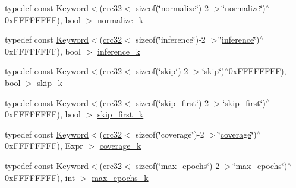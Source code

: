 \begin{DoxyCompactItemize}
\item 
typedef const \hyperlink{classmarian_1_1keywords_1_1Keyword}{Keyword}$<$(\hyperlink{compile__time__crc32_8h_afb8250edaa6a10de4050142c2361fbce}{crc32}$<$ sizeof(\char`\"{}normalize\char`\"{})-\/2 $>$\char`\"{}\hyperlink{namespacemarian_1_1keywords_a0865ee916b32905390a7c6e6bdfd8a9f}{normalize}\char`\"{})$^\wedge$0x\+F\+F\+F\+F\+F\+F\+F\+F), bool $>$ \hyperlink{namespacemarian_1_1keywords_a2d4daed65d80e72c0e922a6e7359f31d}{normalize\+\_\+k}
\item 
typedef const \hyperlink{classmarian_1_1keywords_1_1Keyword}{Keyword}$<$(\hyperlink{compile__time__crc32_8h_afb8250edaa6a10de4050142c2361fbce}{crc32}$<$ sizeof(\char`\"{}inference\char`\"{})-\/2 $>$\char`\"{}\hyperlink{namespacemarian_1_1keywords_a7164ab5ae8f1206943787d0891d89735}{inference}\char`\"{})$^\wedge$0x\+F\+F\+F\+F\+F\+F\+F\+F), bool $>$ \hyperlink{namespacemarian_1_1keywords_a70c1df66249f109b61873988973ed61b}{inference\+\_\+k}
\item 
typedef const \hyperlink{classmarian_1_1keywords_1_1Keyword}{Keyword}$<$(\hyperlink{compile__time__crc32_8h_afb8250edaa6a10de4050142c2361fbce}{crc32}$<$ sizeof(\char`\"{}skip\char`\"{})-\/2 $>$\char`\"{}\hyperlink{namespacemarian_1_1keywords_afbbd32f06a85a40050d9fd36a50d8ea4}{skip}\char`\"{})$^\wedge$0x\+F\+F\+F\+F\+F\+F\+F\+F), bool $>$ \hyperlink{namespacemarian_1_1keywords_ab3f25f4b72577d35dabc1a79a86b75fe}{skip\+\_\+k}
\item 
typedef const \hyperlink{classmarian_1_1keywords_1_1Keyword}{Keyword}$<$(\hyperlink{compile__time__crc32_8h_afb8250edaa6a10de4050142c2361fbce}{crc32}$<$ sizeof(\char`\"{}skip\+\_\+first\char`\"{})-\/2 $>$\char`\"{}\hyperlink{namespacemarian_1_1keywords_a2a9cd87979dc05ce7c893dd1d47e24b0}{skip\+\_\+first}\char`\"{})$^\wedge$0x\+F\+F\+F\+F\+F\+F\+F\+F), bool $>$ \hyperlink{namespacemarian_1_1keywords_ad98b44f9f1590b98af7150b6b1dded7c}{skip\+\_\+first\+\_\+k}
\item 
typedef const \hyperlink{classmarian_1_1keywords_1_1Keyword}{Keyword}$<$(\hyperlink{compile__time__crc32_8h_afb8250edaa6a10de4050142c2361fbce}{crc32}$<$ sizeof(\char`\"{}coverage\char`\"{})-\/2 $>$\char`\"{}\hyperlink{namespacemarian_1_1keywords_a3e4ed89478e91951088b10fd39c1866d}{coverage}\char`\"{})$^\wedge$0x\+F\+F\+F\+F\+F\+F\+F\+F), Expr $>$ \hyperlink{namespacemarian_1_1keywords_a458a9fc8abba425be0189dfc25c927e5}{coverage\+\_\+k}
\item 
typedef const \hyperlink{classmarian_1_1keywords_1_1Keyword}{Keyword}$<$(\hyperlink{compile__time__crc32_8h_afb8250edaa6a10de4050142c2361fbce}{crc32}$<$ sizeof(\char`\"{}max\+\_\+epochs\char`\"{})-\/2 $>$\char`\"{}\hyperlink{namespacemarian_1_1keywords_a688a940c47329752f0dc8a56cde3093d}{max\+\_\+epochs}\char`\"{})$^\wedge$0x\+F\+F\+F\+F\+F\+F\+F\+F), int $>$ \hyperlink{namespacemarian_1_1keywords_a6ed8bd5dbf10318dcdac1c1920b342a9}{max\+\_\+epochs\+\_\+k}

\end{DoxyCompactItemize}

